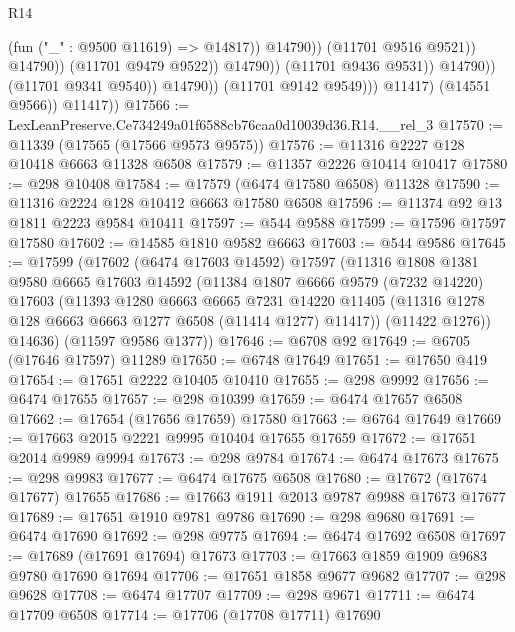 \begin{lexlean}{R14}
\begin{coremodule}
                                              (fun ("_" : @9500 @11619) => @14817))
                                            @14790))
                                        (@11701 @9516 @9521))
                                      @14790))
                                  (@11701 @9479 @9522))
                                @14790))
                            (@11701 @9436 @9531))
                          @14790))
                      (@11701 @9341 @9540))
                    @14790))
                (@11701 @9142 @9549)))
            @11417)
          (@14551 @9566))
        @11417))
@17566 := LexLeanPreserve.Ce734249a01f6588cb76caa0d10039d36.R14.__rel_3
@17570 := @11339 (@17565 (@17566 @9573 @9575))
@17576 := @11316 @2227 @128 @10418 @6663 @11328 @6508
@17579 := @11357 @2226 @10414 @10417
@17580 := @298 @10408
@17584 := @17579 (@6474 @17580 @6508) @11328
@17590 := @11316 @2224 @128 @10412 @6663 @17580 @6508
@17596 := @11374 @92 @13 @1811 @2223 @9584 @10411
@17597 := @544 @9588
@17599 := @17596 @17597 @17580
@17602 := @14585 @1810 @9582 @6663
@17603 := @544 @9586
@17645 := @17599
    (@17602
      (@6474 @17603 @14592)
      @17597
      (@11316
        @1808
        @1381
        @9580
        @6665
        @17603
        @14592
        (@11384
          @1807
          @6666
          @9579
          (@7232 @14220)
          @17603
          (@11393
            @1280
            @6663
            @6665
            @7231
            @14220
            @11405
            (@11316 @1278 @128 @6663 @6663 @1277 @6508 (@11414 @1277) @11417))
          (@11422 @1276))
        @14636)
      (@11597 @9586 @1377))
@17646 := @6708 @92
@17649 := @6705 (@17646 @17597) @11289
@17650 := @6748 @17649
@17651 := @17650 @419
@17654 := @17651 @2222 @10405 @10410
@17655 := @298 @9992
@17656 := @6474 @17655
@17657 := @298 @10399
@17659 := @6474 @17657 @6508
@17662 := @17654 (@17656 @17659) @17580
@17663 := @6764 @17649
@17669 := @17663 @2015 @2221 @9995 @10404 @17655 @17659
@17672 := @17651 @2014 @9989 @9994
@17673 := @298 @9784
@17674 := @6474 @17673
@17675 := @298 @9983
@17677 := @6474 @17675 @6508
@17680 := @17672 (@17674 @17677) @17655
@17686 := @17663 @1911 @2013 @9787 @9988 @17673 @17677
@17689 := @17651 @1910 @9781 @9786
@17690 := @298 @9680
@17691 := @6474 @17690
@17692 := @298 @9775
@17694 := @6474 @17692 @6508
@17697 := @17689 (@17691 @17694) @17673
@17703 := @17663 @1859 @1909 @9683 @9780 @17690 @17694
@17706 := @17651 @1858 @9677 @9682
@17707 := @298 @9628
@17708 := @6474 @17707
@17709 := @298 @9671
@17711 := @6474 @17709 @6508
@17714 := @17706 (@17708 @17711) @17690

\end{coremodule}
\end{lexlean}
